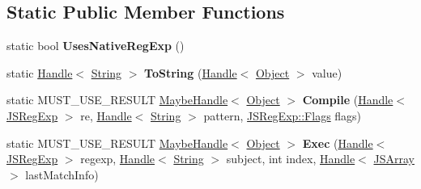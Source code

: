 \subsection*{Static Public Member Functions}
\begin{DoxyCompactItemize}
\item 
static bool {\bfseries Uses\+Native\+Reg\+Exp} ()\hypertarget{classv8_1_1internal_1_1_reg_exp_impl_a1f036a7e906cecf51692e724a54cbcec}{}\label{classv8_1_1internal_1_1_reg_exp_impl_a1f036a7e906cecf51692e724a54cbcec}

\item 
static \hyperlink{classv8_1_1internal_1_1_handle}{Handle}$<$ \hyperlink{classv8_1_1internal_1_1_string}{String} $>$ {\bfseries To\+String} (\hyperlink{classv8_1_1internal_1_1_handle}{Handle}$<$ \hyperlink{classv8_1_1internal_1_1_object}{Object} $>$ value)\hypertarget{classv8_1_1internal_1_1_reg_exp_impl_a86680c63f2568adcd0c136024d05ea85}{}\label{classv8_1_1internal_1_1_reg_exp_impl_a86680c63f2568adcd0c136024d05ea85}

\item 
static M\+U\+S\+T\+\_\+\+U\+S\+E\+\_\+\+R\+E\+S\+U\+LT \hyperlink{classv8_1_1internal_1_1_maybe_handle}{Maybe\+Handle}$<$ \hyperlink{classv8_1_1internal_1_1_object}{Object} $>$ {\bfseries Compile} (\hyperlink{classv8_1_1internal_1_1_handle}{Handle}$<$ \hyperlink{classv8_1_1internal_1_1_j_s_reg_exp}{J\+S\+Reg\+Exp} $>$ re, \hyperlink{classv8_1_1internal_1_1_handle}{Handle}$<$ \hyperlink{classv8_1_1internal_1_1_string}{String} $>$ pattern, \hyperlink{classv8_1_1base_1_1_flags}{J\+S\+Reg\+Exp\+::\+Flags} flags)\hypertarget{classv8_1_1internal_1_1_reg_exp_impl_ac993c4615ac54ca5d2249d5a029ac3b9}{}\label{classv8_1_1internal_1_1_reg_exp_impl_ac993c4615ac54ca5d2249d5a029ac3b9}

\item 
static M\+U\+S\+T\+\_\+\+U\+S\+E\+\_\+\+R\+E\+S\+U\+LT \hyperlink{classv8_1_1internal_1_1_maybe_handle}{Maybe\+Handle}$<$ \hyperlink{classv8_1_1internal_1_1_object}{Object} $>$ {\bfseries Exec} (\hyperlink{classv8_1_1internal_1_1_handle}{Handle}$<$ \hyperlink{classv8_1_1internal_1_1_j_s_reg_exp}{J\+S\+Reg\+Exp} $>$ regexp, \hyperlink{classv8_1_1internal_1_1_handle}{Handle}$<$ \hyperlink{classv8_1_1internal_1_1_string}{String} $>$ subject, int index, \hyperlink{classv8_1_1internal_1_1_handle}{Handle}$<$ \hyperlink{classv8_1_1internal_1_1_j_s_array}{J\+S\+Array} $>$ last\+Match\+Info)\hypertarget{classv8_1_1internal_1_1_reg_exp_impl_a050e6ee8df6369af962c2fcd5baa5811}{}\label{classv8_1_1internal_1_1_reg_exp_impl_a050e6ee8df6369af962c2fcd5baa5811}


\end{DoxyCompactItemize}
